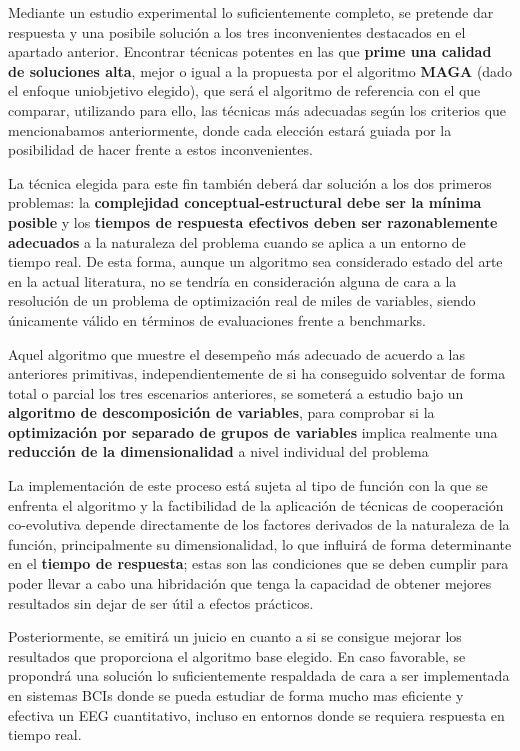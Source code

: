 Mediante un estudio experimental lo suficientemente completo, se pretende dar respuesta y una posibile solución a los tres inconvenientes destacados en el apartado anterior. Encontrar técnicas potentes en las que \textbf{prime una calidad de soluciones alta}, mejor o igual a la propuesta por el algoritmo \textbf{MAGA} (dado el enfoque uniobjetivo elegido), que será el algoritmo de referencia con el que comparar, utilizando para ello, las técnicas más adecuadas según los criterios que mencionabamos anteriormente, donde cada elección estará guiada por la posibilidad de hacer frente a estos inconvenientes.

La técnica elegida para este fin también deberá dar solución a los dos primeros problemas: la \textbf{complejidad conceptual-estructural debe ser la mínima posible} y los \textbf{tiempos de respuesta efectivos deben ser razonablemente adecuados} a la naturaleza del problema cuando se aplica a un entorno de tiempo real. De esta forma, aunque un algoritmo sea considerado estado del arte en la actual literatura, no se tendría en consideración alguna de cara a la resolución de un problema de optimización real de miles de variables, siendo únicamente válido en términos de evaluaciones frente a benchmarks.

Aquel algoritmo que muestre el desempeño más adecuado de acuerdo a las anteriores primitivas, independientemente de si ha conseguido solventar de forma total o parcial los tres escenarios anteriores, se someterá a estudio bajo un \textbf{algoritmo de descomposición de variables}, para comprobar si la \textbf{optimización por separado de grupos de variables} implica realmente una \textbf{reducción de la dimensionalidad} a nivel individual del problema

La implementación de este proceso está sujeta al tipo de función con la que se enfrenta el algoritmo y la factibilidad de la aplicación de técnicas de cooperación co-evolutiva depende directamente de los factores derivados de la naturaleza de la función, principalmente su dimensionalidad, lo que influirá de forma determinante en el \textbf{tiempo de respuesta}; estas son las condiciones que se deben cumplir para poder llevar a cabo una hibridación que tenga la capacidad de obtener mejores resultados sin dejar de ser útil a efectos prácticos.

Posteriormente, se emitirá un juicio en cuanto a si se consigue mejorar los resultados que proporciona el algoritmo base elegido. En caso favorable, se propondrá una solución lo suficientemente respaldada de cara a ser implementada en sistemas BCIs donde se pueda estudiar de forma mucho mas eficiente y efectiva un EEG cuantitativo, incluso en entornos donde se requiera respuesta en tiempo real.